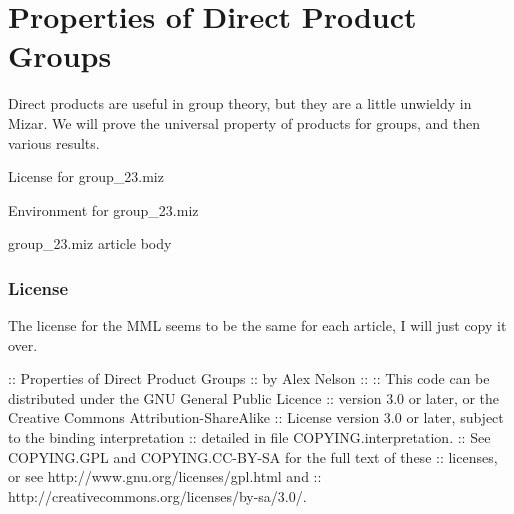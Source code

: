 \chapter{Properties of Direct Product Groups}

Direct products are useful in group theory, but they are a little
unwieldy in Mizar. We will prove the universal property of products for
groups, and then various results.

\nwenddocs{}\endmoddef\nwstartdeflinemarkup\nwenddeflinemarkup
\LA{}License for \code{}group{\_}23.miz\edoc{}~{\nwtagstyle{}}\RA{}

\LA{}Environment for \code{}group{\_}23.miz\edoc{}~{\nwtagstyle{}}\RA{}

\LA{}\code{}group{\_}23.miz\edoc{} article body~{\nwtagstyle{}}\RA{}
\nwendcode{}\nwdocspar

\subsection*{License}
The license for the MML seems to be the same for each article, I will
just copy it over.

\nwenddocs{}\endmoddef\nwstartdeflinemarkup{}\nwenddeflinemarkup
:: Properties of Direct Product Groups
::  by Alex Nelson
::
:: This code can be distributed under the GNU General Public Licence
:: version 3.0 or later, or the Creative Commons Attribution-ShareAlike
:: License version 3.0 or later, subject to the binding interpretation
:: detailed in file COPYING.interpretation.
:: See COPYING.GPL and COPYING.CC-BY-SA for the full text of these
:: licenses, or see http://www.gnu.org/licenses/gpl.html and
:: http://creativecommons.org/licenses/by-sa/3.0/.

\nwendcode{}\nwdocspar

